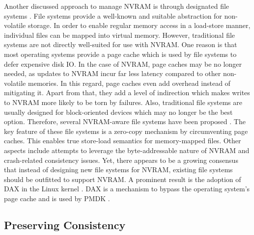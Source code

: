 Another discussed approach to manage \ac{NVRAM} is through designated file
systems \cite{oukid2017data, andrei2017sap}. File systems provide a well-known
and suitable abstraction for non-volatile storage. In order to enable regular
memory access in a load-store manner, individual files can be mapped into
virtual memory. However, traditional file systems are not directly well-suited
for use with \ac{NVRAM}. One reason is that most operating systems provide a
page cache which is used by file systems to defer expensive disk \ac{IO}. In the
case of \ac{NVRAM}, page caches may be no longer needed, as updates to
\ac{NVRAM} incur far less latency compared to other non-volatile memories. In
this regard, page caches even add overhead instead of mitigating it. Apart from
that, they add a level of indirection which makes writes to \ac{NVRAM} more
likely to be torn by failures. Also, traditional file systems are usually
designed for block-oriented devices which may no longer be the best option.
Therefore, several \ac{NVRAM}-aware file systems have been proposed
\cite{condit2009better, wu2011scmfs, dulloor2014system, xu2016nova}. The key
feature of these file systems is a zero-copy mechanism by circumventing page
caches. This enables true store-load semantics for memory-mapped files. Other
aspects include attempts to leverage the byte-addressable nature of \ac{NVRAM}
and crash-related consistency issues. Yet, there appears to be a growing consensus
that instead of designing new file systems for \ac{NVRAM}, existing file systems
should be outfitted to support \ac{NVRAM}. A prominent result is the adoption of
\ac{DAX} in the Linux kernel \cite{oukid2017data, andrei2017sap,
rudoff2017persistent}. \ac{DAX} is a mechanism to bypass the operating system's
page cache and is used by PMDK \cite{rudoff2017persistent, pmdk2018home}.

%
%

\subsection{Preserving Consistency}
\label{ch:nvram-consistency}

